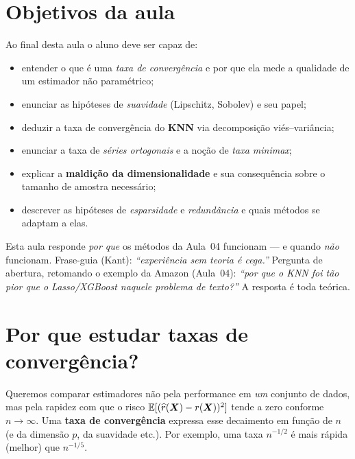 \documentclass[11pt,a4paper]{article}
\begin{document}

\section*{Objetivos da aula}
Ao final desta aula o aluno deve ser capaz de:
\begin{itemize}[leftmargin=1.4cm]
  \item entender o que é uma \emph{taxa de convergência} e por que ela mede a
        qualidade de um estimador não paramétrico;
  \item enunciar as hipóteses de \emph{suavidade} (Lipschitz, Sobolev) e seu papel;
  \item deduzir a taxa de convergência do \textbf{KNN} via decomposição
        viés--variância;
  \item enunciar a taxa de \emph{séries ortogonais} e a noção de \emph{taxa
        minimax};
  \item explicar a \textbf{maldição da dimensionalidade} e sua consequência sobre o
        tamanho de amostra necessário;
  \item descrever as hipóteses de \emph{esparsidade} e \emph{redundância} e quais
        métodos se adaptam a elas.
\end{itemize}

\begin{emsala}
Esta aula responde \emph{por que} os métodos da Aula~04 funcionam --- e quando
\emph{não} funcionam. Frase-guia (Kant): \emph{``experiência sem teoria é cega.''}
Pergunta de abertura, retomando o exemplo da Amazon (Aula~04): \emph{``por que o
KNN foi tão pior que o Lasso/XGBoost naquele problema de texto?''} A resposta é
toda teórica.
\end{emsala}

\section{Por que estudar taxas de convergência?}
Queremos comparar estimadores não pela performance em \emph{um} conjunto de dados,
mas pela rapidez com que o risco $\mathbb{E}[(\widehat{r}(\bm{X})-r(\bm{X}))^2]$ tende a zero conforme
$n\to\infty$. Uma \textbf{taxa de convergência} expressa esse decaimento em função
de $n$ (e da dimensão $p$, da suavidade etc.). Por exemplo, uma taxa $n^{-1/2}$ é
mais rápida (melhor) que $n^{-1/5}$.
\end{document}
